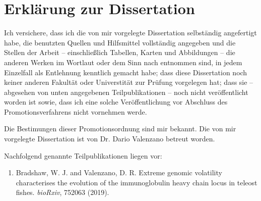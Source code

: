 
\cleardoublepage
\setsinglecolumn
\chapter*{\centering \LARGE Erkl\"arung zur Dissertation}
\pagestyle{empty}
Ich versichere, dass ich die von mir vorgelegte Dissertation selbst\"andig angefertigt habe, die benutzten Quellen und Hilfsmittel vollst\"andig angegeben und die Stellen der Arbeit -- einschlie{\ss}lich Tabellen, Karten und Abbildungen -- die anderen Werken im Wortlaut oder dem Sinn nach entnommen sind, in jedem Einzelfall als Entlehnung kenntlich gemacht habe; dass diese Dissertation noch keiner anderen Fakult\"at oder Universtit\"at zur Pr\"ufung vorgelegen hat; dass sie -- abgesehen von unten angegebenen Teilpublikationen -- noch nicht ver\"offentlicht worden ist sowie, dass ich eine solche Ver\"offentlichung vor Abschluss des Promotionsverfahrens nicht vornehmen werde.

\noindent Die Bestimungen dieser Promotionsordnung sind mir bekannt. Die von mir vorgelegte Dissertation ist von Dr. Dario Valenzano betreut worden.

\noindent Nachfolgend genannte Teilpublikationen liegen vor:

\begin{enumerate}
    \item Bradshaw, W. J. and Valenzano, D. R. Extreme genomic volatility characterises the evolution of the immunoglobulin heavy chain locus in teleost fishes. \textit{bioRxiv}, 752063 (2019). \parencite{bradshaw2019extreme}
\end{enumerate}

\declare{6em}
